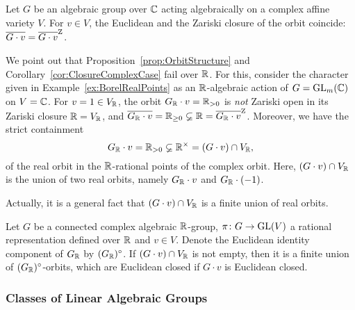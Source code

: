 \begin{cor}\label{cor:ClosureComplexCase}
	Let $G $ be an algebraic group over $\mathbb C$ acting algebraically on a complex affine variety $V$. For $v \in V$, the Euclidean and the Zariski closure of the orbit coincide: $\overline{G \cdot v} = \overline{G \cdot v}^{\operatorname{Z}}$.
\end{cor}

\begin{remark}\label{rem:RealOrbits}
	We point out that Proposition~\ref{prop:OrbitStructure} and Corollary~\ref{cor:ClosureComplexCase} fail over $\mathbb R$. For this, consider the character given in Example~\ref{ex:BorelRealPoints} as an $\mathbb R$-algebraic action of $G = \operatorname{GL}_m(\mathbb C)$ on $V = \mathbb C$. For $v = 1 \in V_\mathbb R$, the orbit $G_{\mathbb R} \cdot v = \mathbb R_{>0}$ is \emph{not} Zariski open in its Zariski closure $\mathbb R = V_{\mathbb R}$, and $\overline{G_\mathbb R \cdot v} = \mathbb R_{\geq 0} \varsubsetneq \mathbb R = \overline{G_\mathbb R \cdot v}^{\operatorname{Z}}$. Moreover, we have the strict containment
		\[ G_{\mathbb R} \cdot v = \mathbb R_{>0} \varsubsetneq \mathbb R^\times = (G \cdot v) \cap V_\mathbb R , \]
	of the real orbit in the $\mathbb R$-rational points of the complex orbit. Here, $(G \cdot v) \cap V_\mathbb R$ is the union of two real orbits, namely $G_{\mathbb R} \cdot v$ and $G_{\mathbb R} \cdot (-1)$.
	\hfill\remSymbol
\end{remark}

Actually, it is a general fact that $(G \cdot v) \cap V_\mathbb R$ is a finite union of real orbits.

\begin{prop} \label{prop:BorelHarishChandraProp2-3}
	Let $G$ be a connected complex algebraic $\mathbb R$-group, $\pi \colon G \to \operatorname{GL}(V)$ a rational representation defined over $\mathbb R$ and $v \in V$. Denote the Euclidean identity component of $G_\mathbb R$ by $(G_{\mathbb R})^\circ$. If $(G \cdot v) \cap V_\mathbb R$ is not empty, then it is a finite union of $(G_{\mathbb R})^\circ$-orbits, which are Euclidean closed if $G \cdot v$ is Euclidean closed.
\end{prop}






\subsubsection{Classes of Linear Algebraic Groups}

